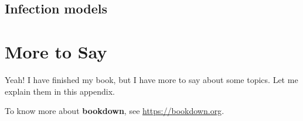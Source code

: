 \documentclass[12pt,]{krantz}
\begin{document}
\section{Infection models}\label{infection-models}

\cleardoublepage 

\appendix {}


\chapter{More to Say}\label{more-to-say}

Yeah! I have finished my book, but I have more to say about some topics.
Let me explain them in this appendix.

To know more about \textbf{bookdown}, see \url{https://bookdown.org}.



\backmatter
\printindex
\end{document}
